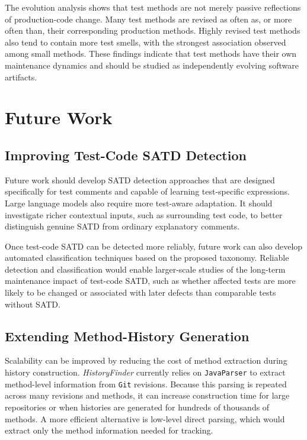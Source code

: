 The evolution analysis shows that test methods are not merely passive reflections of production-code change. Many test methods are revised as often as, or more often than, their corresponding production methods. Highly revised test methods also tend to contain more test smells, with the strongest association observed among small methods. These findings indicate that test methods have their own maintenance dynamics and should be studied as independently evolving software artifacts.

\section{Future Work}

\subsection{Improving Test-Code SATD Detection}

Future work should develop SATD detection approaches that are designed specifically for test comments and capable of learning test-specific expressions. Large language models also require more test-aware adaptation. It should investigate richer contextual inputs, such as surrounding test code, to better distinguish genuine SATD from ordinary explanatory comments.

Once test-code SATD can be detected more reliably, future work can also develop automated classification techniques based on the proposed taxonomy. Reliable detection and classification would enable larger-scale studies of the long-term maintenance impact of test-code SATD, such as whether affected tests are more likely to be changed or associated with later defects than comparable tests without SATD.

\subsection{Extending Method-History Generation}

Scalability can be improved by reducing the cost of method extraction during history construction. \textit{HistoryFinder} currently relies on \texttt{JavaParser} to extract method-level information from \texttt{Git} revisions. Because this parsing is repeated across many revisions and methods, it can increase construction time for large repositories or when histories are generated for hundreds of thousands of methods. A more efficient alternative is low-level direct parsing, which would extract only the method information needed for tracking.

